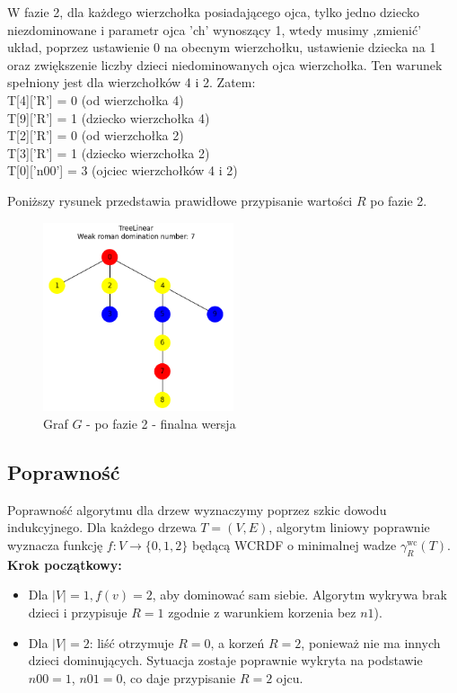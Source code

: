 W fazie 2, dla każdego wierzchołka posiadającego ojca, tylko jedno dziecko niezdominowane i parametr ojca 'ch' wynoszący 1, wtedy musimy ,zmienić' układ, poprzez ustawienie 0 na obecnym wierzchołku, ustawienie dziecka na 1 oraz zwiększenie liczby dzieci niedominowanych ojca wierzchołka. 
Ten warunek spełniony jest dla wierzchołków 4 i 2. Zatem:\\
T[4]['R'] = 0  (od wierzchołka 4)\\
T[9]['R'] = 1  (dziecko wierzchołka 4)\\
T[2]['R'] = 0  (od wierzchołka 2)\\
T[3]['R'] = 1  (dziecko wierzchołka 2)\\
T[0]['n00'] = 3  (ojciec wierzchołków 4 i 2)

Poniższy rysunek przedstawia prawidłowe przypisanie wartości $R$ po fazie 2.\\

\begin{figure}[H]
    \centering
    \includegraphics[width=0.5\textwidth]{assets/phase2.png}
    \caption{Graf $G$ - po fazie 2 - finalna wersja}
    \label{fig:drzewoFaza2}
\end{figure}

\subsection{Poprawność}


Poprawność algorytmu dla drzew wyznaczymy poprzez szkic dowodu indukcyjnego. Dla każdego drzewa $T = (V, E)$, algorytm liniowy poprawnie wyznacza funkcję $f : V \to \{0,1,2\}$ będącą WCRDF o minimalnej wadze $\gamma_R^{\text{wc}}(T)$.\\

\textbf{Krok początkowy:}
\begin{itemize}
    \item Dla $|V| = 1, f(v)= 2 $, aby dominować sam siebie. Algorytm wykrywa brak dzieci i przypisuje $R = 1$ zgodnie z warunkiem korzenia bez $n1$).
    \item Dla $|V| = 2$: liść otrzymuje $R = 0$, a korzeń $R = 2$, ponieważ nie ma innych dzieci dominujących. Sytuacja zostaje poprawnie wykryta na podstawie $n00 = 1$, $n01 = 0$, co daje przypisanie $R=2$ ojcu. 
\end{itemize}

